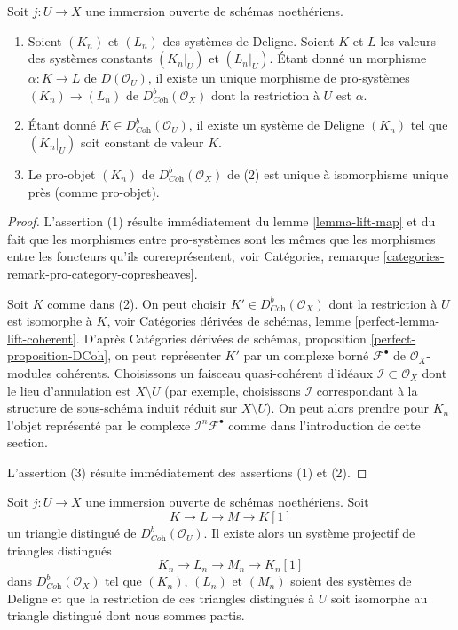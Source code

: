 \begin{lemma}
\label{lemma-extension-by-zero}
Soit $j : U \to X$ une immersion ouverte de schémas noethériens.
\begin{enumerate}
\item Soient $(K_n)$ et $(L_n)$ des systèmes de Deligne. Soient $K$ et $L$ les valeurs des systèmes constants $(K_n|_U)$ et $(L_n|_U)$. Étant donné un morphisme $\alpha : K \to L$ de $D(\mathcal{O}_U)$, il existe un unique morphisme de pro-systèmes $(K_n) \to (L_n)$ de $D^b_{\textit{Coh}}(\mathcal{O}_X)$ dont la restriction à $U$ est $\alpha$.
\item Étant donné $K \in D^b_{\textit{Coh}}(\mathcal{O}_U)$, il existe un système de Deligne $(K_n)$ tel que $(K_n|_U)$ soit constant de valeur $K$.
\item Le pro-objet $(K_n)$ de $D^b_{\textit{Coh}}(\mathcal{O}_X)$ de (2) est unique à isomorphisme unique près (comme pro-objet).
\end{enumerate}
\end{lemma}

\begin{proof}
L'assertion (1) résulte immédiatement du lemme \ref{lemma-lift-map} et du fait que les morphismes entre pro-systèmes sont les mêmes que les morphismes entre les foncteurs qu'ils corereprésentent, voir Catégories, remarque \ref{categories-remark-pro-category-copresheaves}.

\medskip\noindent
Soit $K$ comme dans (2). On peut choisir $K' \in D^b_{\textit{Coh}}(\mathcal{O}_X)$ dont la restriction à $U$ est isomorphe à $K$, voir Catégories dérivées de schémas, lemme \ref{perfect-lemma-lift-coherent}. D'après Catégories dérivées de schémas, proposition \ref{perfect-proposition-DCoh}, on peut représenter $K'$ par un complexe borné $\mathcal{F}^\bullet$ de $\mathcal{O}_X$-modules cohérents. Choisissons un faisceau quasi-cohérent d'idéaux $\mathcal{I} \subset \mathcal{O}_X$ dont le lieu d'annulation est $X \setminus U$ (par exemple, choisissons $\mathcal{I}$ correspondant à la structure de sous-schéma induit réduit sur $X \setminus U$). On peut alors prendre pour $K_n$ l'objet représenté par le complexe $\mathcal{I}^n\mathcal{F}^\bullet$ comme dans l'introduction de cette section.

\medskip\noindent
L'assertion (3) résulte immédiatement des assertions (1) et (2).
\end{proof}

\begin{lemma}
\label{lemma-extension-by-zero-triangle}
Soit $j : U \to X$ une immersion ouverte de schémas noethériens. Soit
$$
K \to L \to M \to K[1]
$$
un triangle distingué de $D^b_{\textit{Coh}}(\mathcal{O}_U)$. Il existe alors un système projectif de triangles distingués
$$
K_n \to L_n \to M_n \to K_n[1]
$$
dans $D^b_{\textit{Coh}}(\mathcal{O}_X)$ tel que $(K_n)$, $(L_n)$ et $(M_n)$ soient des systèmes de Deligne et que la restriction de ces triangles distingués à $U$ soit isomorphe au triangle distingué dont nous sommes partis.
\end{lemma}


